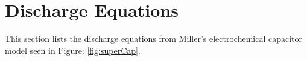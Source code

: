 \newpage
\section{Discharge Equations}
\label{app:disChargeEqs}
This section lists the discharge equations from Miller's electrochemical capacitor model \cite{electrochem_intro} seen in Figure: \ref{fig:superCap}.


